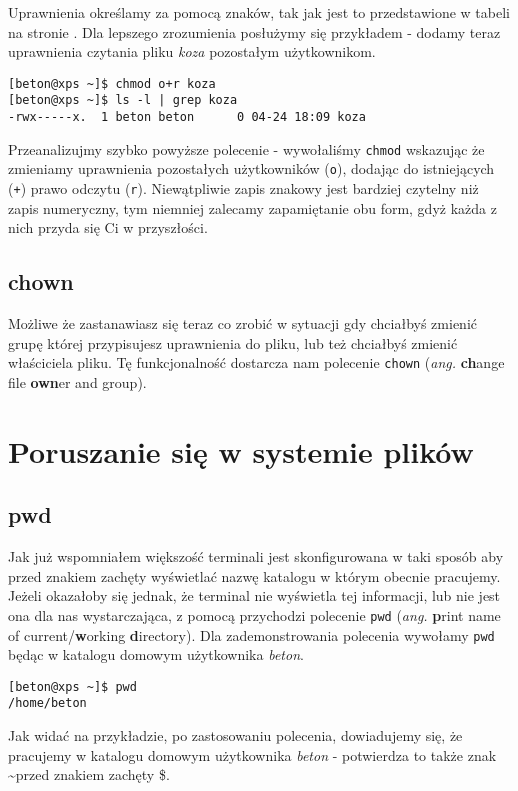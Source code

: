 \FloatBarrier

Uprawnienia określamy za pomocą znaków, tak jak jest to przedstawione w tabeli na stronie \pageref{tab:uprawnienia}. Dla lepszego zrozumienia posłużymy się przykładem - dodamy teraz uprawnienia czytania pliku \textit{koza} pozostałym użytkownikom.
\begin{verbatim}
[beton@xps ~]$ chmod o+r koza 
[beton@xps ~]$ ls -l | grep koza
-rwx-----x.  1 beton beton      0 04-24 18:09 koza
\end{verbatim}
Przeanalizujmy szybko powyższe polecenie - wywołaliśmy \texttt{chmod} wskazując że zmieniamy uprawnienia pozostałych użytkowników (\texttt{o}), dodając do istniejących (\texttt{+}) prawo odczytu (\texttt{r}). Niewątpliwie zapis znakowy jest bardziej czytelny niż zapis numeryczny, tym niemniej zalecamy zapamiętanie obu form, gdyż każda z nich przyda się Ci w przyszłości.

\subsection{chown}
Możliwe że zastanawiasz się teraz co zrobić w sytuacji gdy chciałbyś zmienić grupę której przypisujesz uprawnienia do pliku, lub też chciałbyś zmienić właściciela pliku. Tę funkcjonalność dostarcza nam polecenie \texttt{chown} (\textit{ang.} \textbf{ch}ange file \textbf{own}er and group).

\section{Poruszanie się w systemie plików}
\subsection{pwd}
Jak już wspomniałem większość terminali jest skonfigurowana w taki sposób aby przed znakiem zachęty wyświetlać nazwę katalogu w którym obecnie pracujemy. Jeżeli okazałoby się jednak, że terminal nie wyświetla tej informacji, lub nie jest ona dla nas wystarczająca, z pomocą przychodzi polecenie \texttt{pwd} (\textit{ang.} \textbf{p}rint name of current/\textbf{w}orking \textbf{d}irectory). Dla zademonstrowania polecenia wywołamy \texttt{pwd} będąc w katalogu domowym użytkownika \textit{beton}.
\begin{verbatim}
[beton@xps ~]$ pwd
/home/beton
\end{verbatim} 
Jak widać na przykładzie, po zastosowaniu polecenia, dowiadujemy się, że pracujemy w katalogu domowym użytkownika \textit{beton} - potwierdza to także znak \textasciitilde przed znakiem zachęty \$.

